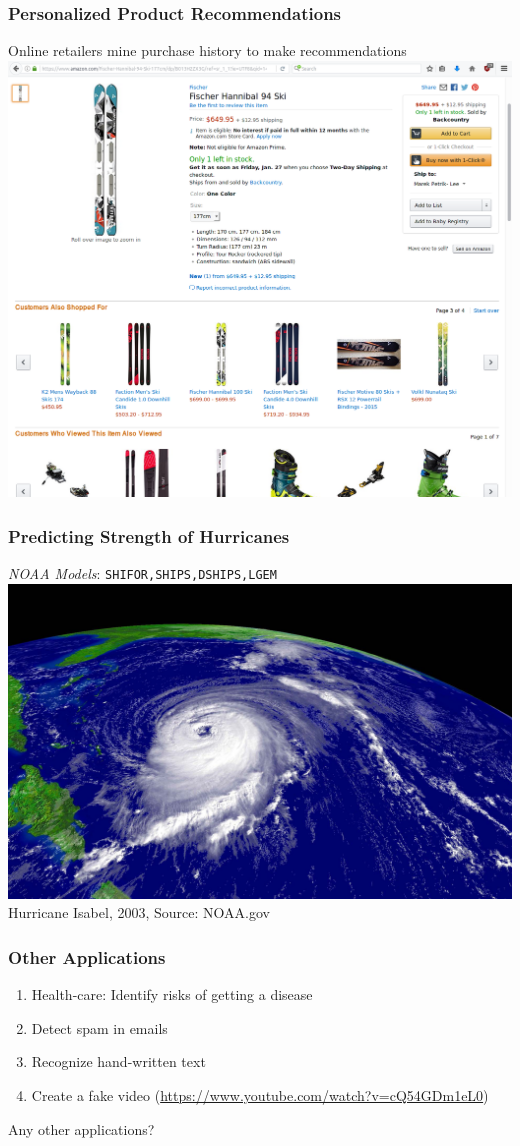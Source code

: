 \documentclass{beamer}
\begin{document}
\begin{frame} \frametitle{Personalized Product Recommendations}
    \centering
    Online retailers mine purchase history to make recommendations\\ [3mm]
    \includegraphics[width=0.7\linewidth]{../figs/class1/recommendation.png}
\end{frame}


\begin{frame} \frametitle{Predicting Strength of Hurricanes}
    \centering
    \emph{NOAA Models}: \texttt{SHIFOR,SHIPS,DSHIPS,LGEM} \\ [3mm]
    \includegraphics[width=0.8\linewidth]{../figs/class1/hurricane_image.jpg} \\
    \tiny{Hurricane Isabel, 2003, Source: NOAA.gov }
\end{frame}

\begin{frame} \frametitle{Other Applications}
    \begin{enumerate}
            \item Health-care: Identify risks of getting a disease
            \item Detect spam in emails
            \item Recognize hand-written text
            \item Create a fake video (\url{https://www.youtube.com/watch?v=cQ54GDm1eL0})
    \end{enumerate}

    \alert{Any other applications?}
\end{frame}
\end{document}
